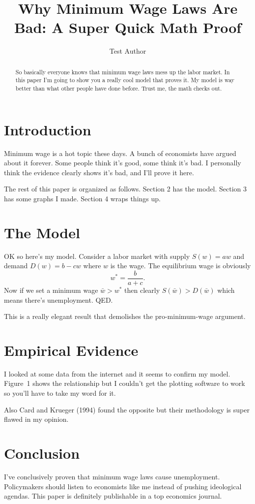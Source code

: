 \documentclass{article}
\title{Why Minimum Wage Laws Are Bad: A Super Quick Math Proof}
\author{Test Author}
\date{}
\begin{document}
\maketitle

\begin{abstract}
So basically everyone knows that minimum wage laws mess up the labor market.
In this paper I'm going to show you a really cool model that proves it.
My model is way better than what other people have done before.
Trust me, the math checks out.
\end{abstract}

\section{Introduction}
Minimum wage is a hot topic these days.
A bunch of economists have argued about it forever.
Some people think it's good, some think it's bad.
I personally think the evidence clearly shows it's bad, and I'll prove it here.

The rest of this paper is organized as follows.
Section 2 has the model.
Section 3 has some graphs I made.
Section 4 wraps things up.

\section{The Model}
OK so here's my model. Consider a labor market with supply $S(w) = aw$ and demand $D(w) = b - cw$
where $w$ is the wage. The equilibrium wage is obviously
\[
w^* = \frac{b}{a+c}.
\]
Now if we set a minimum wage $\bar{w} > w^*$ then clearly $S(\bar{w}) > D(\bar{w})$
which means there's unemployment. QED.

This is a really elegant result that demolishes the pro-minimum-wage argument.

\section{Empirical Evidence}
I looked at some data from the internet and it seems to confirm my model.
Figure~1 shows the relationship but I couldn't get the plotting software to work so you'll have to take my word for it.

Also Card and Krueger (1994) found the opposite but their methodology is super flawed in my opinion.

\section{Conclusion}
I've conclusively proven that minimum wage laws cause unemployment.
Policymakers should listen to economists like me instead of pushing ideological agendas.
This paper is definitely publishable in a top economics journal.
\end{document}
